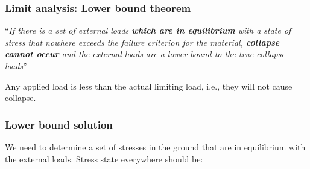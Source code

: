 \documentclass[notes]{beamer}
\begin{document}

\begin{frame}
	\frametitle{Limit analysis: Lower bound theorem}
	
	``\textit{If there is a set of external loads \textbf{which are in equilibrium} with a state of
 stress that nowhere exceeds the failure criterion for the material, \textbf{collapse cannot occur} and the external loads are a lower bound to the true
	collapse loads}''\\
	\vspace{1em}
	
	Any applied load is less than the actual limiting load, i.e., they will not cause collapse.\\
	\mode<handout>{
	\vspace{5cm}
	}
\end{frame}

\begin{frame}
	\frametitle{Lower bound solution}
	We need to determine a set of
stresses in the ground that are in equilibrium with the external
loads. Stress state everywhere should be:
	\mode<handout>{
		\vspace{5cm}
	}
\end{frame}
\end{document}
